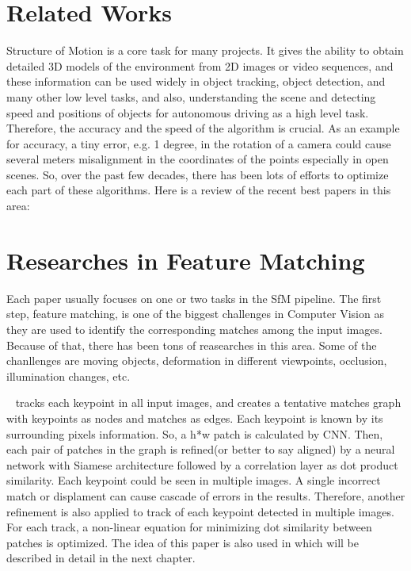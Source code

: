 \documentclass[11pt]{article}
\begin{document}
    \section{Related Works}
    Structure of Motion is a core task for many projects. It gives the ability to obtain detailed 3D models
    of the environment from 2D images or video sequences, and these information can be used widely in object tracking,
    object detection, and many other low level tasks, and also, understanding the scene and detecting speed and
    positions of objects for autonomous driving as a high level task. Therefore, the accuracy and the speed
    of the algorithm is crucial. As an example for accuracy, a tiny error, e.g. 1 degree, in the rotation of
    a camera could cause several meters misalignment in the coordinates of the points especially in open scenes.
    So, over the past few decades, there has been lots of efforts to optimize each part of these algorithms.
    Here is a review of the recent best papers in this area:

    \newpage
    \section{Researches in Feature Matching}
    Each paper usually focuses on one or two tasks in the SfM pipeline. The first step, feature matching,
    is one of the biggest challenges in Computer Vision as they are used to identify the corresponding
    matches among the input images. Because of that, there has been tons of reasearches in this area.
    Some of the chanllenges are moving objects, deformation in different viewpoints, occlusion, illumination
    changes, etc.

    ~\cite{Dusmanu2020Multi} tracks each keypoint in all input images, and creates a tentative
    matches graph with keypoints as nodes and matches as edges. Each keypoint is known by its surrounding pixels
    information. So, a h*w patch is calculated by CNN. Then, each pair of patches in the graph is refined(or better
    to say aligned) by a neural network with Siamese architecture followed by a correlation layer as dot product
    similarity. Each keypoint could be seen in multiple images. A single incorrect match or displament can cause
    cascade of errors in the results. Therefore, another refinement is also applied to track of each keypoint
    detected in multiple images. For each track, a non-linear equation for minimizing dot similarity between
    patches is optimized. The idea of this paper is also used in \cite{lindenberger2021pixsfm} which will be
    described in detail in the next chapter.
\end{document}
